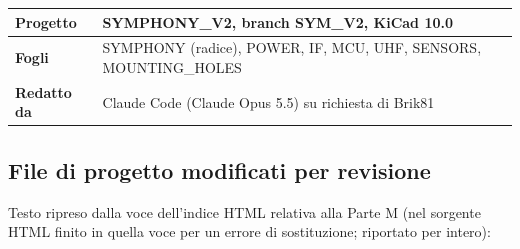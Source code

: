 {\begin{xltabular}{\linewidth}{>{\hsize\raggedright\arraybackslash}X>{\hsize\raggedright\arraybackslash}X}
\textbf{Progetto} & SYMPHONY\_\allowbreak{}V2, branch SYM\_\allowbreak{}V2, KiCad 10.0 \\
\midrule[0.15pt]

\textbf{Fogli} & SYMPHONY (radice), POWER, IF, MCU, UHF, SENSORS, MOUNTING\_\allowbreak{}HOLES \\
\midrule[0.15pt]

\textbf{Redatto da} & Claude Code (Claude Opus 5.5) su richiesta di Brik81 \\
\midrule[0.15pt]

\bottomrule
\end{xltabular}}

\subsection[File di progetto modificati per revisione]{File di progetto modificati per revisione}

{\small Testo ripreso dalla voce dell'indice HTML relativa alla Parte M (nel sorgente HTML finito in quella voce per un errore di sostituzione; riportato per intero):}

